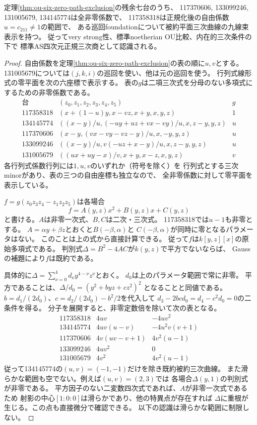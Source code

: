 \begin{theorem}[六零係数の一部分族を除く曲線表示]
\label{thm:ou-six-zero-curve-recognition}
定理\ref{thm:ou-six-zero-path-exclusion}の残余七台のうち、
117370606, 133099246, 131005679, 134145774は全非零係数で、
117358318は正規化後の自由係数$u=c_{211}\ne1$の範囲で、
ある巡回foundationについて被約平面三次曲線の九線束表示を持つ。
従ってvery strong性、標準noetherian OU比較、内在的三次条件の下で
標準AS四次元正規三次商として認識される。
\end{theorem}
\begin{proof}
自由係数を定理\ref{thm:ou-six-zero-path-exclusion}の表の順に$u,v$とする。
131005679については$(j,k,i)$の巡回を使い、他は元の巡回を使う。
行列式線形式の零平面を次の六座標で表示する。
表の$g$は二項三次式を分母のない多項式にするための非零係数である。
\[
\begin{array}{r|l|c}
\text{台}&(z_0,z_1,z_2,z_3,z_4,z_5)&g\\ \hline
117358318&(x+(1-u)y,x-vz,x+y,x,y,z)&1\\
134145774&((x-y)/u,(-uy+uz+vx-vy)/u,x,z-y,y,z)&u\\
117370606&(x-y,(vx-vy-vz-y)/u,x,-y,y,z)&u\\
133099246&((x-y)/u,v(-uz+x-y)/u,x,z-y,y,z)&u\\
131005679&((ux+uy-x)/v,x+y,x-z,x,y,z)&v
\end{array}
\]
各行列式係数行列には$1,u,v$のいずれか（符号を除く）を
行列式とする三次minorがあり、表の三つの自由座標も独立なので、
全非零係数に対して零平面を表示している。

$f=g(z_0z_3z_4-z_1z_2z_5)$は各場合
\[
 f=A(y,z)x^2+B(y,z)x+C(y,z)
\]
と書ける。$A$は非零一次式、$B,C$は二次・三次式。
117358318では$u-1$も非零とする。
$A=\alpha y+\beta z$とおくと$B(-\beta,\alpha)$と
$C(-\beta,\alpha)$が同時に零となるパラメータはない。
このことは上の式から直接計算できる。
従って$f$は$k[y,z][x]$の原始多項式である。
判別式$\Delta=B^2-4AC$が$k(y,z)$で平方でないならば、
Gaussの補題により$f$は既約である。

具体的に$\Delta=\sum_{\nu=0}^4d_\nu y^{4-\nu}z^\nu$とおく。
$d_0$は上のパラメータ範囲で常に非零。
平方であることは、$\Delta/d_0=(y^2+b yz+c z^2)^2$
となることと同値である。
$b=d_1/(2d_0)$、$c=d_2/(2d_0)-b^2/2$を代入して
$d_3-2bc d_0=d_4-c^2d_0=0$の二条件を得る。
分子を展開すると、非零定数倍を除いて次の表となる。
\[
\begin{array}{r|cc}
117358318&4uv&-4uv^2\\
134145774&4uv(u-v)&-4u^2v(v+1)\\
117370606&4v(uv-v+1)&4v^2(u-1)\\
133099246&4uv^2&0\\
131005679&4v^2&4v^2(u-1)
\end{array}
\]
従って134145774の$(u,v)=(-1,-1)$だけを除き既約被約三次曲線。
また滑らかな範囲も空でない。例えば$(u,v)=(2,3)$では
各場合$\Delta(y,1)$の判別式が非零である。
平方因子のない二変数四次式であれば、$A$が非零一次式であるため
射影の中心$[1:0:0]$は滑らかであり、他の特異点が存在すれば
$\Delta$に重根が生じる。この点も直接微分で確認できる。
以下の認識は滑らかな範囲に制限しない。


\end{proof}
